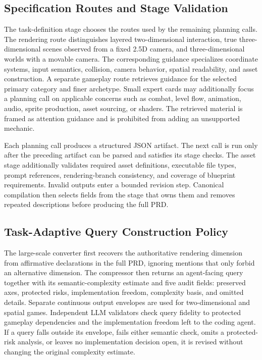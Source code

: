 \documentclass{article}
\begin{document}
\subsection{Specification Routes and Stage Validation}

The task-definition stage chooses the routes used by the remaining planning calls. The rendering route distinguishes layered two-dimensional interaction, true three-dimensional scenes observed from a fixed 2.5D camera, and three-dimensional worlds with a movable camera. The corresponding guidance specializes coordinate systems, input semantics, collision, camera behavior, spatial readability, and asset construction. A separate gameplay route retrieves guidance for the selected primary category and finer archetype. Small expert cards may additionally focus a planning call on applicable concerns such as combat, level flow, animation, audio, sprite production, asset sourcing, or shaders. The retrieved material is framed as attention guidance and is prohibited from adding an unsupported mechanic.

Each planning call produces a structured JSON artifact. The next call is run only after the preceding artifact can be parsed and satisfies its stage checks. The asset stage additionally validates required asset definitions, executable file types, prompt references, rendering-branch consistency, and coverage of blueprint requirements. Invalid outputs enter a bounded revision step. Canonical compilation then selects fields from the stage that owns them and removes repeated descriptions before producing the full PRD.

\subsection{Task-Adaptive Query Construction Policy}
\label{app:query_construction}

The large-scale converter first recovers the authoritative rendering dimension from affirmative declarations in the full PRD, ignoring mentions that only forbid an alternative dimension. The compressor then returns an agent-facing query together with its semantic-complexity estimate and five audit fields: preserved axes, protected risks, implementation freedom, complexity basis, and omitted details. Separate continuous output envelopes are used for two-dimensional and spatial games. Independent LLM validators check query fidelity to protected gameplay dependencies and the implementation freedom left to the coding agent. If a query falls outside its envelope, fails either semantic check, omits a protected-risk analysis, or leaves no implementation decision open, it is revised without changing the original complexity estimate.
\end{document}
